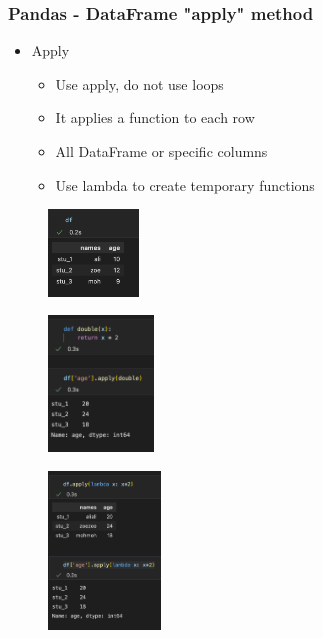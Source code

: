 \begin{frame}\frametitle{Pandas - DataFrame "apply" method}
   \begin{minipage}{0.58\linewidth}
      \begin{itemize}
         \item Apply
         \begin{itemize}
            \item Use apply, do not use loops
            \item It applies a function to each row
            \item All DataFrame or specific columns
            \item Use lambda to create temporary functions
         \end{itemize}
      \end{itemize}
      \vspace{.5cm}
      \begin{figure}[H]
         \includegraphics[width=2.4cm]{../images/illustrations/pandas_df_ex.png}
      \end{figure}
   \end{minipage}
   \begin{minipage}{0.38\linewidth}
      \begin{figure}[H]
         \includegraphics[width=2.8cm]{../images/illustrations/pandas_apply_func.png}
      \end{figure}
      \begin{figure}[H]
         \includegraphics[width=3cm]{../images/illustrations/pandas_apply_lambda.png}
      \end{figure}
   \end{minipage}
\end{frame}


